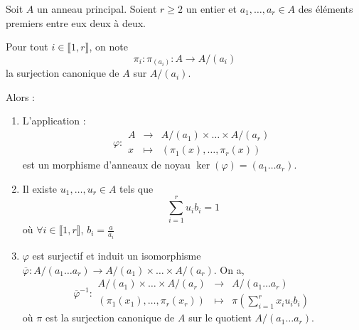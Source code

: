 






  Soit $A$ un anneau principal. Soient $r \geq 2$ un entier et $a_1, \dots, a_r \in A$ des éléments premiers entre eux deux à deux.

  \begin{notation}
    Pour tout $i \in \llbracket 1, r \rrbracket$, on note
    \[ \pi_i : \pi_{(a_i)} : A \rightarrow A/(a_i) \]
    la surjection canonique de $A$ sur $A/(a_i)$.
  \end{notation}

  \begin{theorem}[Chinois]
    \label{theoreme-chinois-1}
    Alors :
    \begin{enumerate}[label=(\roman*)]
      \item L'application :
      \[
        \varphi :
        \begin{array}{ccc}
          A &\rightarrow& A/(a_1) \times \dots \times A/(a_r) \\
          x &\mapsto& (\pi_1(x), \dots, \pi_r(x))
        \end{array}
      \]
      est un morphisme d'anneaux de noyau $\ker(\varphi) = (a_1 \dots a_r)$.
      \item Il existe $u_1, \dots, u_r \in A$ tels que
      \[ \sum_{i=1}^{r} u_i b_i = 1 \]
      où $\forall i \in \llbracket 1, r \rrbracket$, $b_i = \frac{a}{a_i}$
      \item $\varphi$ est surjectif et induit un isomorphisme $\overline{\varphi} : A/(a_1 \dots a_r) \rightarrow A/(a_1) \times \dots \times A/(a_r)$. On a,
      \[
        \overline{\varphi}^{-1} :
        \begin{array}{ccc}
          A/(a_1) \times \dots \times A/(a_r) &\rightarrow& A/(a_1 \dots a_r) \\
          (\pi_1(x_1), \dots, \pi_r(x_r)) &\mapsto& \pi \left( \sum_{i=1}^{r} x_i u_i b_i \right)
        \end{array}
      \]
      où $\pi$ est la surjection canonique de $A$ sur le quotient $A/(a_1 \dots a_r)$.
    \end{enumerate}
  \end{theorem}

